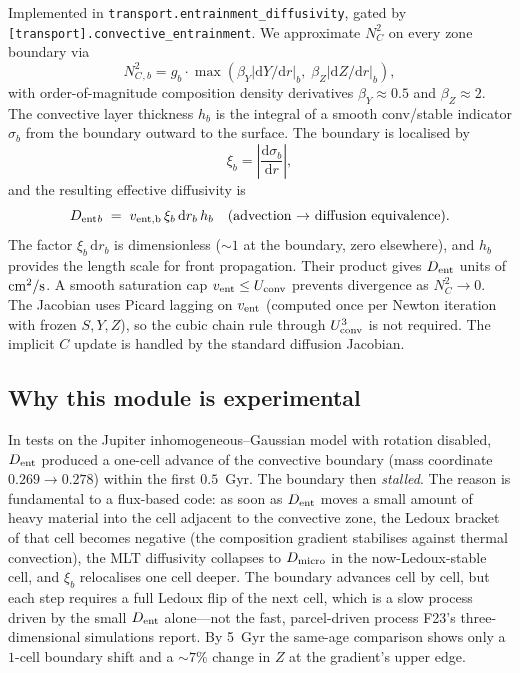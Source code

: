\documentclass{aastex631}
\newcommand{\dd}{\mathrm{d}}
\newcommand{\Vconv}{U_{\rm conv}}
\newcommand{\NCsq}{N_C^2}
\newcommand{\Dent}{D_{\rm ent}}
\newcommand{\Dmicro}{D_{\rm micro}}
\begin{document}
Implemented in \texttt{transport.entrainment\_diffusivity}, gated by
\texttt{[transport].convective\_entrainment}.  We approximate
$\NCsq$ on every zone boundary via
\begin{equation}
\NCsq{}_{,b} = g_b \cdot \max\!\left(\beta_Y |\dd Y/\dd r|_b,\; \beta_Z |\dd Z/\dd r|_b\right),
\end{equation}
with order-of-magnitude composition density derivatives
$\beta_Y \approx 0.5$ and $\beta_Z \approx 2$.  The convective layer
thickness $h_b$ is the integral of a smooth conv/stable indicator
$\sigma_b$ from the boundary outward to the surface.  The boundary is
localised by
\begin{equation}
\xi_b = \left|\frac{\dd \sigma_b}{\dd r}\right|,
\end{equation}
and the resulting effective diffusivity is
\begin{equation}
\Dent{}_b
    \;=\; v_{\rm ent,b}\,\xi_b\,\dd r_b\,h_b
    \quad
    \text{(advection $\to$ diffusion equivalence)}.
\label{eq:Dent}
\end{equation}
The factor $\xi_b\,\dd r_b$ is dimensionless ($\sim 1$ at the
boundary, zero elsewhere), and $h_b$ provides the length scale for
front propagation.  Their product gives $\Dent$ units of $\rm cm^2/s$.
A smooth saturation cap $v_{\rm ent} \le \Vconv$ prevents
divergence as $\NCsq \to 0$.  The Jacobian uses Picard lagging on
$v_{\rm ent}$ (computed once per Newton iteration with frozen $S, Y,
Z$), so the cubic chain rule through $\Vconv^3$ is not required.
The implicit $C$ update is handled by the standard diffusion
Jacobian.

\subsection{Why this module is experimental}

In tests on the Jupiter inhomogeneous--Gaussian model with rotation
disabled, $\Dent$ produced a one-cell advance of the convective
boundary (mass coordinate $0.269 \to 0.278$) within the first
$0.5$~Gyr.  The boundary then \emph{stalled}.  The reason is
fundamental to a flux-based code: as soon as $\Dent$ moves a small
amount of heavy material into the cell adjacent to the convective
zone, the Ledoux bracket of that cell becomes negative (the
composition gradient stabilises against thermal convection), the MLT
diffusivity collapses to $\Dmicro$ in the now-Ledoux-stable cell, and
$\xi_b$ relocalises one cell deeper.  The boundary advances cell by
cell, but each step requires a full Ledoux flip of the next cell,
which is a slow process driven by the small $\Dent$ alone---not the
fast, parcel-driven process F23's three-dimensional simulations
report.  By 5~Gyr the same-age comparison shows only a $1$-cell
boundary shift and a $\sim 7\%$ change in $Z$ at the gradient's
upper edge.
\end{document}
